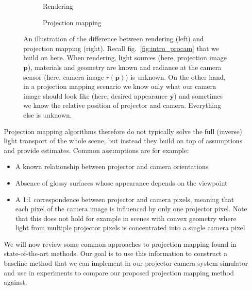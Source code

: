 \begin{figure}[ht]
    \centering
    \begin{subfigure}[b]{0.48\textwidth}
        \centering
        \def\svgwidth{\textwidth}
        
        \caption{Rendering}
    \end{subfigure}
    \hfill
    \begin{subfigure}[b]{0.48\textwidth}
        \centering
        \def\svgwidth{\textwidth}
        
        \caption{Projection mapping}
    \end{subfigure}
    \caption{An illustration of the difference between rendering (left) and projection mapping (right). Recall fig.~\ref{fig:intro_procam} that we build on here. When rendering, light sources (here, projection image \(\bm{p}\)), materials and geometry are known and radiance at the camera sensor (here, camera image \(r(\bm{p})\)) is unknown. On the other hand, in a projection mapping scenario we know only what our camera image should look like (here, desired appearance \(\bm{y}\)) and sometimes we know the relative position of projector and camera. Everything else is unknown.}
    \label{fig:background_proj_map_vs_rendering}
\end{figure}

Projection mapping algorithms therefore do not typically solve the full (inverse) light transport of the whole scene, but instead they build on top of assumptions and provide estimates. Common assumptions are for example:

\begin{itemize}
    \item A known relationship between projector and camera orientations
    \item Absence of glossy surfaces whose appearance depends on the viewpoint
    \item A 1:1 correspondence between projector and camera pixels, meaning that each pixel of the camera image is influenced by only one projector pixel. Note that this does not hold for example in scenes with convex geometry where light from multiple projector pixels is concentrated into a single camera pixel
\end{itemize}

We will now review some common approaches to projection mapping found in state-of-the-art methods. Our goal is to use this information to construct a baseline method that we can implement in our projector-camera system simulator and use in experiments to compare our proposed projection mapping method against.

